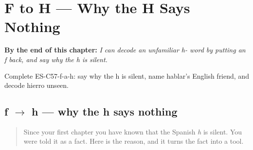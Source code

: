 
\chapter{F to H --- Why the H Says Nothing}
\label{ch:sound-f-h}

\begin{chapteropening}
\textbf{By the end of this chapter:} \emph{I can decode an unfamiliar h- word by putting an f back, and say why the h is silent.}

Complete ES-C57-f-a-h: say why the h is silent, name hablar's English friend, and decode hierro unseen.
\end{chapteropening}

\section[f to h]{f $\to$ h — why the h says nothing}

\label{lesson:ES-C57-f-a-h}



\begin{quote}
Since your first chapter you have known that the Spanish \emph{h} is silent. You were told it as a fact. Here is the reason, and it turns the fact into a tool.
\end{quote}

